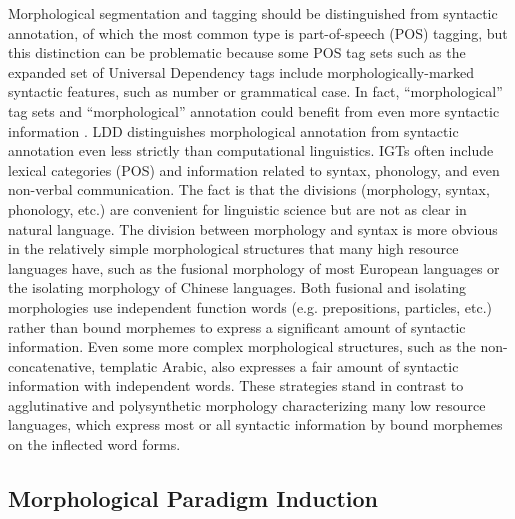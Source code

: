 \documentclass[12pt]{article}
\begin{document}
Morphological segmentation and tagging should be distinguished from syntactic annotation, of which the most common type is part-of-speech (POS) tagging, but this distinction can be problematic because some POS tag sets such as the expanded set of Universal Dependency tags \cite{de_marneffe_universal_2014} include morphologically-marked syntactic features, such as number or grammatical case. In fact, ``morphological'' tag sets and ``morphological'' annotation could benefit from even more syntactic information \cite{cotterell_cross-lingual_2017}. LDD distinguishes morphological annotation from syntactic annotation even less strictly than computational linguistics. IGTs often include lexical categories (POS) and information related to syntax, phonology, and even non-verbal communication. The fact is that the divisions (morphology, syntax, phonology, etc.) are convenient for linguistic science but are not as clear in natural language. The division between morphology and syntax is more obvious in the relatively simple morphological structures that many high resource languages have, such as the fusional morphology of most European languages or the isolating morphology of Chinese languages. Both fusional and isolating morphologies use independent function words (e.g. prepositions, particles, etc.) rather than bound morphemes to express a significant amount of syntactic information. Even some more complex morphological structures, such as the non-concatenative, templatic Arabic, also expresses a fair amount of syntactic information with independent words. These strategies stand in contrast to agglutinative and polysynthetic morphology characterizing many low resource languages, which express most or all syntactic information by bound morphemes on the inflected word forms. 

\subsection{Morphological Paradigm Induction}
\label{paradigms}
\end{document}
